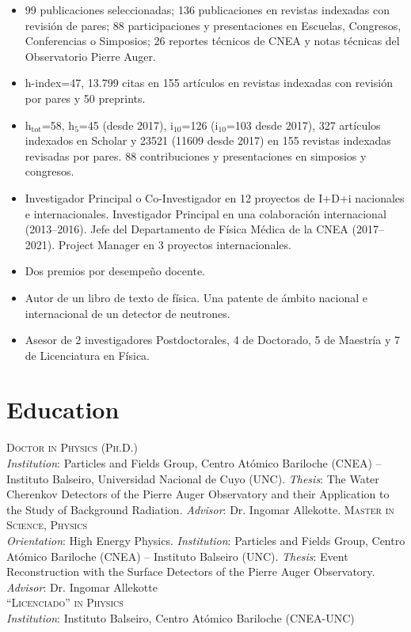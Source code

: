 \begin{itemize}
    \item {} 99 publicaciones seleccionadas; 136 publicaciones en revistas indexadas con revisión de pares; 88 participaciones y presentaciones en Escuelas, Congresos, Conferencias o Simposios; 26 reportes técnicos de CNEA y notas técnicas del Observatorio Pierre Auger.
    \item {} h-index=47, 13.799 citas en 155 artículos en revistas indexadas con revisión por pares y 50 preprints.
    \item {} h$_{\text{tot}}$=58, h$_5$=45 (desde 2017), i$_{10}$=126 (i$_{10}$=103 desde 2017), 327 artículos indexados en Scholar y 23521 (11609 desde 2017) en 155 revistas indexadas revisadas por pares. 88 contribuciones y presentaciones en simposios y congresos.
    \item {} Investigador Principal o Co-Investigador en 12 proyectos de I+D+i nacionales e internacionales. Investigador Principal en una colaboración internacional (2013--2016). Jefe del Departamento de Física Médica de la CNEA (2017--2021). Project Manager en 3 proyectos internacionales.
    \item {} Dos premios por desempeño docente.
    \item {} Autor de un libro de texto de física. Una patente de ámbito nacional e internacional de un detector de neutrones.
    \item {} Asesor de 2 investigadores Postdoctorales, 4 de Doctorado, 5 de Maestría y 7 de Licenciatura en Física.
\end{itemize}
\fi

\ifeng
\section*{Education}
\noindent
{}\textsc{Doctor in Physics (Ph.D.)}\\
{\emph{Institution}}: Particles and Fields Group, Centro Atómico Bariloche (CNEA) -- Instituto Balseiro, Universidad Nacional de Cuyo (UNC). {\emph{Thesis}}: The Water Cherenkov Detectors of the Pierre Auger Observatory and their Application to the Study of Background Radiation. {\emph{Advisor}}: Dr. Ingomar Allekotte.
\textsc{Master in Science, Physics}\\
{\emph{Orientation}}: High Energy Physics. {\emph{Institution}}: Particles and Fields Group, Centro Atómico Bariloche (CNEA) -- Instituto Balseiro (UNC). {\emph{Thesis}}: Event Reconstruction with the Surface Detectors of the Pierre Auger Observatory. {\emph{Advisor}}: Dr. Ingomar Allekotte\\
\textsc{``Licenciado'' in Physics}\\
{\emph{Institution}}: Instituto Balseiro, Centro Atómico Bariloche (CNEA-UNC)\\
\else
